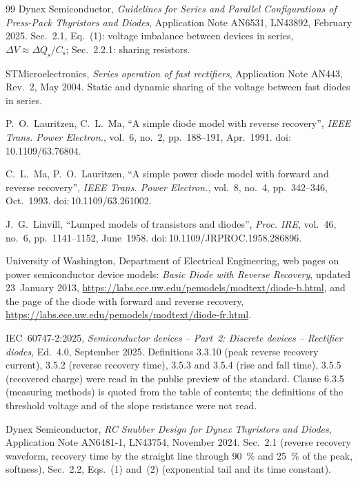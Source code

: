 \documentclass[10pt,a4paper]{scrartcl}
\begin{document}
\begin{thebibliography}{99}
Dynex Semiconductor, \emph{Guidelines for Series and Parallel Configurations of Press-Pack Thyristors and Diodes}, Application Note AN6531, LN43892, February 2025. Sec.~2.1, Eq.~(1): voltage imbalance between devices in series, $\Delta V \approx \Delta Q_\mathrm{s}/C_\mathrm{s}$; Sec.~2.2.1: sharing resistors.

STMicroelectronics, \emph{Series operation of fast rectifiers}, Application Note AN443, Rev.~2, May 2004. Static and dynamic sharing of the voltage between fast diodes in series.

P.~O.~Lauritzen, C.~L.~Ma, ``A simple diode model with reverse recovery'', \emph{IEEE Trans. Power Electron.}, vol.~6, no.~2, pp.~188--191, Apr.~1991. doi:\,10.1109/63.76804.

C.~L.~Ma, P.~O.~Lauritzen, ``A simple power diode model with forward and reverse recovery'', \emph{IEEE Trans. Power Electron.}, vol.~8, no.~4, pp.~342--346, Oct.~1993. doi:\,10.1109/63.261002.

J.~G.~Linvill, ``Lumped models of transistors and diodes'', \emph{Proc. IRE}, vol.~46, no.~6, pp.~1141--1152, June~1958. doi:\,10.1109/JRPROC.1958.286896.

University of Washington, Department of Electrical Engineering, web pages on power semiconductor device models: \emph{Basic Diode with Reverse Recovery}, updated 23~January 2013, \url{https://labs.ece.uw.edu/pemodels/modtext/diode-b.html}, and the page of the diode with forward and reverse recovery, \url{https://labs.ece.uw.edu/pemodels/modtext/diode-fr.html}.

IEC~60747-2:2025, \emph{Semiconductor devices -- Part~2: Discrete devices -- Rectifier diodes}, Ed.~4.0, September 2025. Definitions 3.3.10 (peak reverse recovery current), 3.5.2 (reverse recovery time), 3.5.3 and 3.5.4 (rise and fall time), 3.5.5 (recovered charge) were read in the public preview of the standard. Clause 6.3.5 (measuring methods) is quoted from the table of contents; the definitions of the threshold voltage and of the slope resistance were not read.

Dynex Semiconductor, \emph{RC Snubber Design for Dynex Thyristors and Diodes}, Application Note AN6481-1, LN43754, November 2024. Sec.~2.1 (reverse recovery waveform, recovery time by the straight line through \SI{90}{\percent} and \SI{25}{\percent} of the peak, softness), Sec.~2.2, Eqs.~(1) and~(2) (exponential tail and its time constant).


\end{thebibliography}
\end{document}
